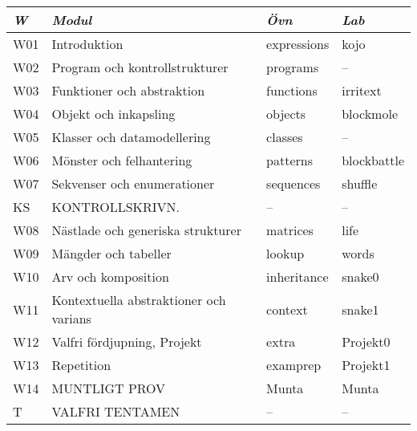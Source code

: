 \begin{tabular}{l|l|l|l}
\textit{W} & \textit{Modul} & \textit{Övn} & \textit{Lab} \\ \hline \hline
W01 & Introduktion & expressions & kojo \\
W02 & Program och kontrollstrukturer & programs & -- \\
W03 & Funktioner och abstraktion & functions & irritext \\
W04 & Objekt och inkapsling & objects & blockmole \\
W05 & Klasser och datamodellering & classes & -- \\
W06 & Mönster och felhantering & patterns & blockbattle \\
W07 & Sekvenser och enumerationer & sequences & shuffle \\
KS & KONTROLLSKRIVN. & -- & -- \\
W08 & Nästlade och generiska strukturer & matrices & life \\
W09 & Mängder och tabeller & lookup & words \\
W10 & Arv och komposition & inheritance & snake0 \\
W11 & Kontextuella abstraktioner och varians & context & snake1 \\
W12 & Valfri fördjupning, Projekt & extra & Projekt0 \\
W13 & Repetition & examprep & Projekt1 \\
W14 & MUNTLIGT PROV & Munta & Munta \\
T & VALFRI TENTAMEN & -- & -- \\
\end{tabular}
